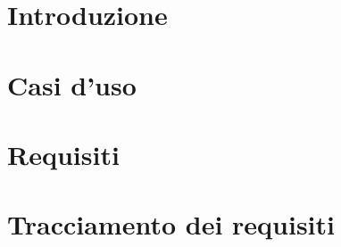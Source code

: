\documentclass[a4paper, oneside, openany, dvipsnames, table]{article}
\begin{document}
\copertina{} 
\tableofcontents
\newpage

\newpage
\section{Introduzione}

\newpage
\section{Casi d'uso}

\newpage

\newpage

\newpage

\newpage

\section{Requisiti}
\section{Tracciamento dei requisiti}
\end{document}
